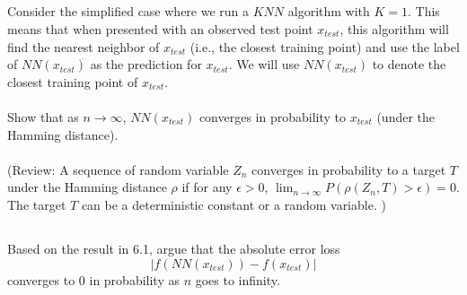 \documentclass{exam}
\begin{document}
\subsection{}
Consider the simplified case where we run a $KNN$ algorithm with $K = 1$. This means that when presented with an observed test point $x_{test}$, this algorithm will find the nearest neighbor of $x_{test}$ (i.e., the closest training point) and use the label of $NN(x_{test})$ as the prediction for $x_{test}$. We will use $NN(x_{test})$ to denote the closest training point of $x_{test}$. \\\\
Show that as $n \to \infty$, $NN(x_{test})$ converges in probability to $x_{test}$ (under the Hamming distance).\\\\
(Review: A sequence of random variable $Z_n$ converges in probability to a target $T$ under the Hamming distance $\rho$ if for any $\epsilon > 0$, $\lim_{n \to \infty} P(\rho(Z_n, T) > \epsilon) = 0$. The target $T$ can be a deterministic constant or a random variable. )

\subsection{}
Based on the result in 6.1, argue that the absolute error loss $$|f(NN(x_{test})) - f(x_{test})|$$ converges to $0$ in probability as $n$ goes to infinity.  
\end{document}
